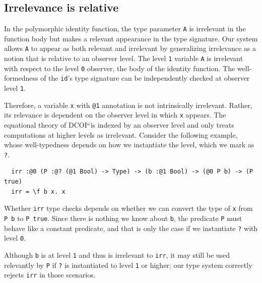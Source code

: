\documentclass[acmsmall, screen=true, nonacm=true,
  review=\ifpublic false\else true\fi,
  anonymous=\ifanonymous true\else false\fi
]{acmart}
\makeatletter
\newcommand{\name}{\texorpdfstring{DCOI$^{\omega}$\@\xspace}{DCOI-omega}}
\makeatother
\begin{document}
\subsection{Irrelevance is relative}

In the polymorphic identity function, the type parameter \lstinline{A}
is irrelevant in the function body but makes a relevant appearance in
the type signature. Our system allows \lstinline{A} to appear as both
relevant and irrelevant by generalizing irrelevance as a notion that
is relative to an observer level. The level \lstinline{1} variable \lstinline{A}
is irrelevant with respect to the level \lstinline{0} observer, the body of the
identity function. The well-formedness of the \lstinline{id}'s type
signature can be independently checked at observer level \lstinline{1}.

Therefore, a variable \lstinline{x} with \lstinline{@1} annotation
is not intrinsically irrelevant. Rather, its
relevance is dependent on the observer level in which \lstinline{x}
appears. The equational theory of \name is indexed by an observer
level and only treats computations at higher levels as irrelevant.
Consider the following example, whose well-typedness depends on how we
instantiate the level, which we mark as \lstinline{?}.

\begin{lstlisting}
  irr :@0 (P :@? (@1 Bool) -> Type) -> (b :@1 Bool) -> (@0 P b) -> (P true)
  irr = \f b x. x
\end{lstlisting}

Whether \lstinline{irr} type checks depends on whether we can convert the
type of \lstinline{x} from \lstinline{P b} to
\lstinline{P true}. Since there is nothing we know about \lstinline{b},
the predicate \lstinline{P} must behave like a
constant predicate, and that is only the case if we instantiate \lstinline{?}
with level \lstinline{0}.

Although \lstinline{b} is at level \lstinline{1} and thus
is irrelevant to \lstinline{irr}, it may still be used relevantly by
\lstinline{P} if \lstinline{?} is instantiated to level \lstinline{1} or
higher; our type system correctly rejects \lstinline{irr}
in those scenarios.

\end{document}
